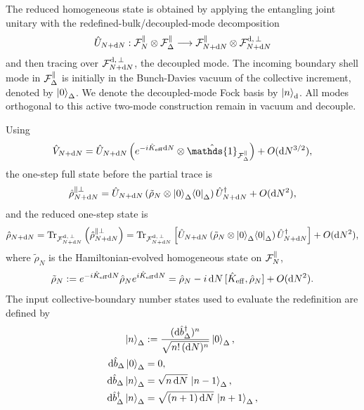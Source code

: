 \documentclass{article}
\def\cF{{\cal F}}
\newcommand{\openone}{\hat{\mathds{1}}}
\def\Tr{\mathrm{Tr}}
\numberwithin{equation}{section}
\begin{document}
	The reduced homogeneous state is obtained by applying the entangling joint unitary with the redefined-bulk/decoupled-mode decomposition
	\[
	\hat U_{N+\dd N}:\cF_N^\parallel\otimes\cF_\Delta^\parallel
	\longrightarrow \cF_{N+\dd N}^\parallel\otimes\cF^{\rm d,\,\perp}_{N+\dd N}
	\]
	and then tracing over \(\cF^{\rm d,\,\perp}_{N+\dd N}\), the decoupled mode. The incoming boundary shell mode in \(\cF_\Delta^\parallel\) is initially in the Bunch-Davies vacuum of the collective increment, denoted by \(\ket{0}_\Delta\). We denote the decoupled-mode Fock basis by \(\ket n_{\rm d}\). All modes orthogonal to this active two-mode construction remain in vacuum and decouple.

	Using
	\begin{equation}
		\hat V_{N+\dd N} = \hat U_{N+\dd N} \left( e^{-i\hat K_{\rm eff}\dd N}\otimes \openone_{\cF_\Delta^\parallel} \right) + O(\dd N^{3/2}),
	\end{equation}
	the one-step full state before the partial trace is
	\begin{equation}
		\hat\rho_{N+\dd N}^{\parallel\perp} = \hat U_{N+\dd N} \left( \tilde{\rho}_N \otimes \ket{0}_\Delta\!\bra{0}_\Delta \right) \hat U_{N+\dd N}^\dagger + O(\dd N^2),
	\end{equation}
	and the reduced one-step state is
	\begin{equation}
		\hat\rho_{N+\dd N} = \Tr_{\cF^{\rm d,\,\perp}_{N+\dd N}} \left( \hat\rho_{N+\dd N}^{\parallel\perp} \right) = \Tr_{\cF^{\rm d,\,\perp}_{N+\dd N}} \left[ \hat U_{N+\dd N} \left( \tilde{\rho}_N \otimes \ket{0}_\Delta\!\bra{0}_\Delta \right) \hat U_{N+\dd N}^\dagger \right] + O(\dd N^2),
		\label{eq:rhoTraceInputFull}
	\end{equation}
	where \(\tilde{\rho}_N\) is the Hamiltonian-evolved homogeneous state on \(\cF_N^\parallel\),
	\begin{equation}
		\tilde{\rho}_N := e^{-i\hat K_{\rm eff}\dd N} \hat\rho_N e^{i\hat K_{\rm eff}\dd N} = \hat\rho_N - i\,\dd N\,[\hat K_{\rm eff},\hat\rho_N] + O(\dd N^2).
		\label{eq:rhoTildeApp}
	\end{equation}
	The input collective-boundary number states used to evaluate the redefinition are defined by
	\begin{align}
		\ket{n}_\Delta &:= \frac{(\dd\hat b_\Delta^\dagger)^n} {\sqrt{n!\,(\dd N)^n}} \ket{0}_\Delta, \\ \dd\hat b_\Delta\ket{0}_\Delta &=0, \\ \dd\hat b_\Delta\ket{n}_\Delta &= \sqrt{n\,\dd N}\,\ket{n-1}_\Delta, \\ \dd\hat b_\Delta^\dagger\ket{n}_\Delta &= \sqrt{(n+1)\,\dd N}\,\ket{n+1}_\Delta,
		\label{eq:numberStatesTracingApp}
	\end{align}
\end{document}
